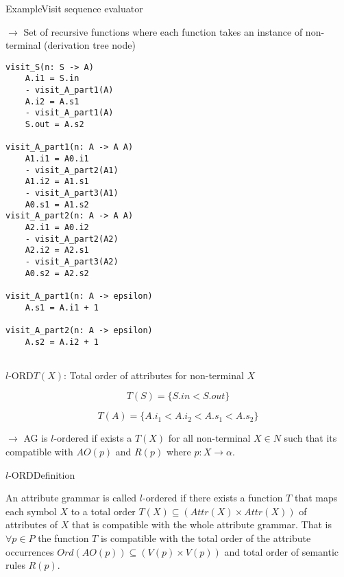 \begin{frame}[fragile=singleslide]{Example}{Visit sequence evaluator}

$\to$ Set of \alert{recursive functions} where each function takes an \alert{instance of non-terminal} (derivation tree node)

\begin{multicols}{2}
\begin{Verbatim}[fontsize=\scriptsize]
visit_S(n: S -> A)
    A.i1 = S.in
    - visit_A_part1(A)
    A.i2 = A.s1
    - visit_A_part1(A)
    S.out = A.s2

visit_A_part1(n: A -> A A)
    A1.i1 = A0.i1
    - visit_A_part2(A1)
    A1.i2 = A1.s1
    - visit_A_part3(A1)
    A0.s1 = A1.s2
visit_A_part2(n: A -> A A)
    A2.i1 = A0.i2
    - visit_A_part2(A2)
    A2.i2 = A2.s1
    - visit_A_part3(A2)
    A0.s2 = A2.s2

visit_A_part1(n: A -> epsilon)
    A.s1 = A.i1 + 1

visit_A_part2(n: A -> epsilon)
    A.s2 = A.i2 + 1
    
\end{Verbatim}
\end{multicols}
\end{frame}


\begin{frame}{$l$-ORD}{$T(X)$: Total order of attributes for non-terminal $X$ }

\[  T(S) = \{ S.\mathit{in} < S.\mathit{out}  \}  \]

\[  T(A) = \{ A.i_1 < A.i_2 < A.s_1 < A.s_2 \}  \]

\newlinevspace

$\to$ AG is $l$-ordered if exists a $T(X)$  for all non-terminal $X \in N$ such that its \alert{compatible} with $\mathit{AO}(p)$ and $R(p)$ where $p: X \rightarrow \alpha$. 

\end{frame}

\begin{frame}{$l$-ORD}{Definition}

\begin{definition}
An attribute grammar is called $l$-ordered if there exists a function $T$ that maps each symbol $X$ to a total order $T(X) \subseteq (\mathit{Attr}(X) \times \mathit{Attr}(X))$ of attributes of $X$ that is \alert{compatible} with the whole attribute grammar. That is $\forall p \in P$ the function $T$ is \alert{compatible} with the total order of the attribute occurrences $\mathit{Ord}(\mathit{AO}(p)) \subseteq (V(p) \times V(p))$ and total order of semantic rules $R(p)$.

\end{definition}
\end{frame}

